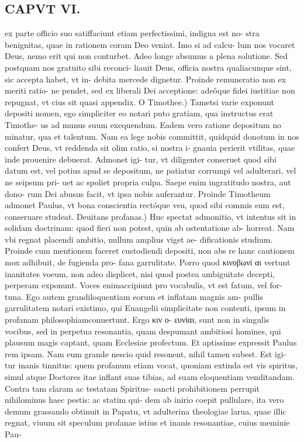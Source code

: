 \documentclass{article}
\begin{document}
\begin{pages}
\section*{CAPVT VI. }
\marginpar{[ p.85 ]}\pstart ex parte officio suo satiffaciunt etiam perfectissimi, indigna est no- stra benignitas, quae in rationem coram Deo veniat. Imo si ad calcu- lum nos vocaret Deus, nemo erit qui non conturbet. Adeo longe absumus a plena solutione. Sed postquam nos gratuito sibi reconci- liauit Deus, officia nostra qualiacunque sint, sic accepta habet, vt in- debita mercede dignetur. Proinde remuneratio non ex meriti ratio- ne pendet, sed ex liberali Dei acceptione: adeôque fidei iustitiae non repugnat, vt cius sit quasi appendix.  \pend\pstart O Timothee.) Tametsi varie exponunt depositi nomen, ego simpliciter eo notari puto gratiam, qua instructus erat Timothe- us ad munus suum exequendum. Eadem vero ratione depositum no minatur, qua et talentum. Nam ea lege nobis committit, quidquid donotum in nos confert Deus, vt reddenda sit olim ratio, si nostra i- gnauia perierit vtilitas, quae inde prouenire debuerat. Admonet igi- tur, vt diligenter conseruet quod sibi datum est, vel potius apud se depositum, ne patiatur corrumpi vel adulterari, vel ne seipsum pri- uet ac spoliet propria culpa. Saepe enim ingratitudo nostra, aut dono- rum Dei abusus facit, vt ipsa nobis auferantur. Proinde Timotheum admonet Paulus, vt bona conscientia rectóque vsu, quod sibi commis sum est, conseruare studeat.  \pend\pstart Deuitans profanas.) Huc spectat admonitio, vt intentus sit in solidam doctrinam: quod fieri non potest, quin ab ostentatione ab- horreat. Nam vbi regnat placendi ambitio, nullum amplius viget ae- dificationis studium. Proinde cum mentionem faceret custodiendi depositi, non abs re hanc cautionem mox adhibuit, de fugienda pro- fana garrulitate. Porro quod κινοβωνί αι vertunt inanitates voeum, non adeo displicet, nisi quod postea ambiguitate decepti, perperam exponunt. Voces enimaccipiunt pro vocabulis, vt est fatum, vel for- tuna. Ego autem grandiloquentiam eorum et inflatam magnis am- pullis garrulitatem notari existimo, qui Euangelii simplicitate non contenti, ipsum in profanam philosophiamconuertunt. Ergo κιν ο- ευνίαι, sunt non in singulis vocibus, sed in perpetua resonantia, quam despumant ambitiosi homines, qui plausum magis captant, quam Ecclesiae profectum. Et aptissime expressit Paulus rem ipsam. Nam eum grande nescio quid resonent, nihil tamen subest. Est igi- tur inanis tinnitus: quem profanum etiam vocat, quoniam extinda est vis spiritus, simul atque Doctores itae inflant suas tibias, ad suam eloquentiam venditandam. Contra tam claram ac testatam Spiritus- sancti prohibitionem perrupit nihilominus haec pestis: ac statim qui- dem ab inirio coepit pullulare, ita vero demum grassando obtinuit in Papatu, vt adulterina theologiae larua, quae illic regnat, viuum sit speculum profanae istius et inanis resonantiae, cuius meminie Pau-  \pend

\end{pages}
\end{document}
